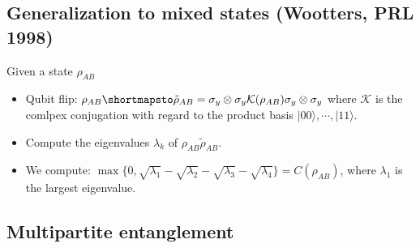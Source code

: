 \documentclass[12pt]{book}
\theoremstyle{definition}
\let\mapsto\shortmapsto
\newcommand{\mapsto}{\longmapsto}
\newcommand{\si}{\sigma}
\newcommand{\ket}[1]{\vert {#1} \rangle}
\begin{document}
\subsection{Generalization to mixed states (Wootters, PRL 1998)}
Given a state $\rho_{AB}$
\begin{itemize}
  \item Qubit flip: $\rho_{AB} \mapsto \tilde \rho_{AB} = \si_y \otimes \si_y \mathcal K(\rho_{AB}) \si_y \otimes\si_y$ where $\mathcal K$ is the comlpex conjugation with regard to the product basis $\ket{00}, \cdots, \ket{11}$.
  \item Compute the eigenvalues $\lambda_k$ of $\rho_{AB}\tilde \rho_{AB}$.
  \item We compute: $\max\{0, \sqrt{\lambda_1} - \sqrt{\lambda_2} - \sqrt{\lambda_3} - \sqrt{\lambda_4}\} = C(\rho_{AB})$, where $\lambda_1$ is the largest eigenvalue.
\end{itemize}

\subsection{Multipartite entanglement}
\end{document}
